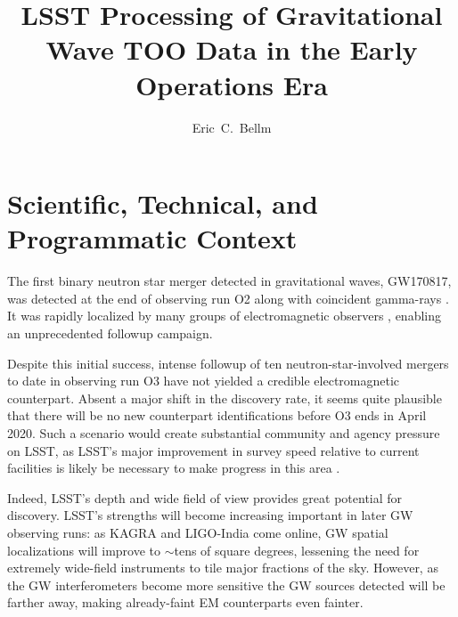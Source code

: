 \documentclass[OPS,toc,lsstdraft]{lsstdoc}
\title{LSST Processing of Gravitational Wave TOO Data in the Early Operations Era}
\author{
Eric~C.~Bellm
}
\begin{document}

\maketitle

\section{Scientific, Technical, and Programmatic Context}

The first binary neutron star merger detected in gravitational waves, GW170817, was detected at the end of observing run O2 \citep{2017PhRvL.119p1101A} along with coincident gamma-rays \citep{2017ApJ...848L..13A}.  
It was rapidly localized by many groups of electromagnetic observers \citep{2017ApJ...848L..12A}, enabling an unprecedented followup campaign.

Despite this initial success, intense followup of ten neutron-star-involved mergers to date in observing run O3 have not yielded a credible electromagnetic counterpart.
Absent a major shift in the discovery rate, it seems quite plausible that there will be no new counterpart identifications before O3 ends in April 2020.
Such a scenario would create substantial community and agency pressure on LSST, as LSST's major improvement in survey speed relative to current facilities is likely be necessary to make progress in this area \citep[e.g.,][]{2019arXiv191011246C}.

Indeed, LSST's depth and wide field of view provides great potential for discovery. 
LSST's strengths will become increasing important in later GW observing runs: 
as KAGRA and LIGO-India come online, GW spatial localizations will improve to $\sim$tens of square degrees, lessening the need for extremely wide-field instruments to tile major fractions of the sky.  
However, as the GW interferometers become more sensitive the GW sources detected will be farther away, making already-faint EM counterparts even fainter.
\end{document}
